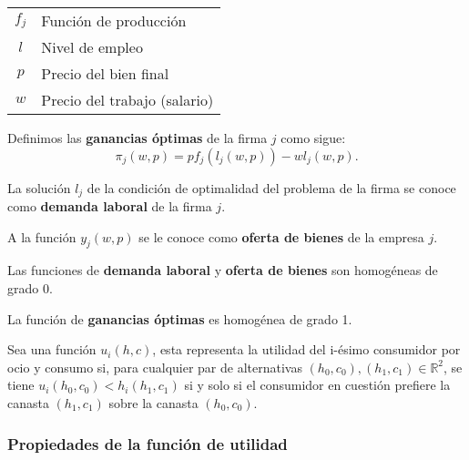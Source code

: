 \documentclass[8pt,a4paper]{extarticle}
\begin{document}
\begin{multicols}{3}
	\begin{center}
		\begin{tabular}{ c l }
			\hline
			$f_j$ & Función de producción        \\
			$l$   & Nivel de empleo              \\
			$p$   & Precio del bien final        \\
			$w$   & Precio del trabajo (salario) \\
			\hline
		\end{tabular}
	\end{center}

	\begin{boxdef}
		Definimos las \textbf{ganancias óptimas} de la firma $j$ como sigue:
		\[
			\pi_j(w, p) = pf_j(l_j(w, p)) - wl_j(w, p)
			.\]
	\end{boxdef}

	\begin{boxdef}
		La solución $l_j$ de la condición de optimalidad del problema de la firma se conoce como \textbf{demanda laboral} de la firma $j$.
	\end{boxdef}

	\begin{boxdef}
		A la función $y_j(w, p)$ se le conoce como \textbf{oferta de bienes} de la empresa $j$.
	\end{boxdef}

	\begin{boxprop}
		Las funciones de \textbf{demanda laboral} y \textbf{oferta de bienes}  son homogéneas de grado 0.
	\end{boxprop}

	\begin{boxprop}
		La función de \textbf{ganancias óptimas} es homogénea de grado 1.
	\end{boxprop}

	\begin{boxdef}
		Sea una función $u_i(h, c)$, esta representa la utilidad del i-ésimo  consumidor por ocio y consumo si, para cualquier par de alternativas $(h_0, c_0), (h_1, c_1) \in \mathbb{R}^2$, se tiene $u_i(h_0, c_0) < h_i(h_1, c_1)$ si y solo si  el consumidor en cuestión prefiere la canasta $(h_1, c_1)$ sobre la canasta $(h_0, c_0)$.
	\end{boxdef}

	\subsubsection*{Propiedades de la función de utilidad}


\end{multicols}
\end{document}
